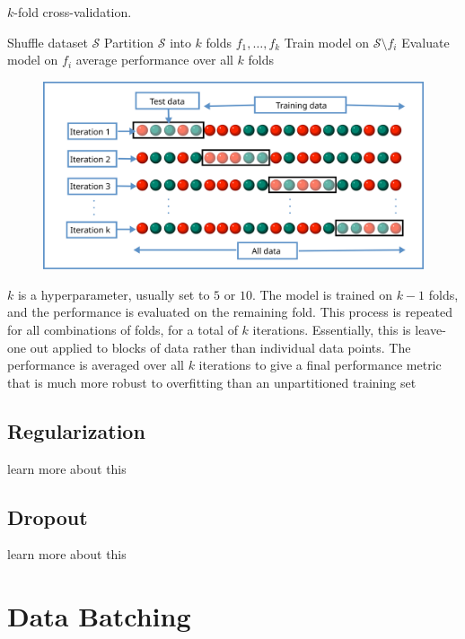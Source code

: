 \documentclass[12pt]{report}
\theoremstyle{definition}
\theoremstyle{remark}
\begin{document}
\begin{algorithm}
    \caption{$k$-fold cross-validation.}\label{alg:k-fold}
    \begin{algorithmic}[1]
        \State Shuffle dataset $\mathcal{S}$
        \State Partition $\mathcal{S}$ into $k$ folds $f_1, \ldots, f_k$
            \State Train model on $\mathcal{S} \setminus f_i$
            \State Evaluate model on $f_i$
        \EndFor
        \Return average performance over all $k$ folds
    \end{algorithmic}
\end{algorithm}

\begin{figure}[h]
    \centering
    \includegraphics[width=0.7\linewidth]{figs/kfold_cross_validation.png}
    \caption{\cite{commons_filek-fold_2024}}
    \label{fig:enter-label}
\end{figure}

$k$ is a hyperparameter, usually set to $5$ or $10$. The model is trained on $k-1$ folds, and the performance is evaluated on the remaining fold. This process is repeated for all combinations of folds, for a total of $k$ iterations. Essentially, this is leave-one out applied to blocks of data rather than individual data points. The performance is averaged over all $k$ iterations to give a final performance metric that is much more robust to overfitting than an unpartitioned training set

\subsection{Regularization}

learn more about this

\subsection{Dropout}
learn more about this


\section{Data Batching}
\end{document}
